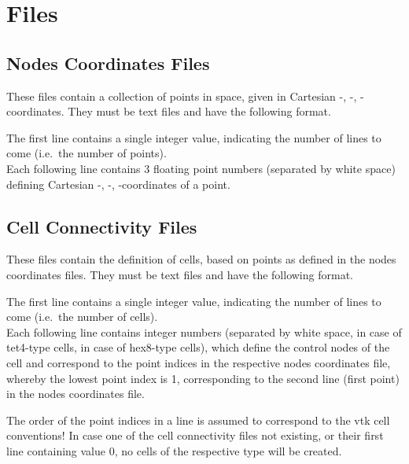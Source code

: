 \section{ Files} \label{files,sec:ecart_invgrid}
%
\subsection{Nodes Coordinates Files}
These files contain a collection of points in space, given in Cartesian -, -, 
-coordinates. They must be text files and have the following format.

The first line contains a single integer value, indicating the number of lines to come (i.e.\ the 
number of points).\\
Each following line contains 3 floating point numbers (separated by white space) defining Cartesian 
-, -, -coordinates of a point.

\subsection{Cell Connectivity Files}
These files contain the definition of cells, based on points as defined in the nodes coordinates files.
They must be text files and have the following format.

The first line contains a single integer value, indicating the number of lines to come (i.e.\ the 
number of cells).\\
Each following line contains  integer numbers (separated by white space,  
in case of tet4-type cells,  in case of hex8-type cells), which define the control nodes 
of the cell and correspond to the point indices in the respective nodes coordinates file, whereby the 
lowest point index is 1, corresponding to the second line (first point) in the nodes coordinates file.

The order of the point indices in a line is assumed to correspond to the vtk cell conventions!
In case one of the cell connectivity files not existing, or their first line containing value 0, no cells
of the respective type will be created.

